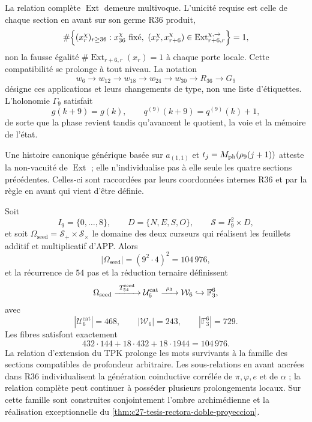 La relation complète \(\operatorname{Ext}\) demeure multivoque.
L'unicité requise est celle de chaque section en avant sur son germe R36
produit,
\[
 \#\Bigl\{(x_r^\chi)_{r\ge36}:x_{36}^\chi\text{ fixé},\ 
 (x_r^\chi,x_{r+6}^\chi)
 \in\operatorname{Ext}^{\chi,\rightarrow}_{r+6,r}\Bigr\}=1,
\]
non la fausse égalité \(\#\operatorname{Ext}_{r+6,r}(x_r)=1\) à chaque porte
locale. Cette compatibilité se prolonge à tout niveau. La notation
\[
 w_6\longrightarrow w_{12}\longrightarrow w_{18}\longrightarrow w_{24}
 \longrightarrow w_{30}\longrightarrow R_{36}\longrightarrow G_9
\]
désigne ces applications et leurs changements de type, non une liste d'étiquettes.
L'holonomie \(\Gamma_9\) satisfait
\[
 g(k+9)=g(k),
 \qquad q^{(9)}(k+9)=q^{(9)}(k)+1,
\]
de sorte que la phase revient tandis qu'avancent le quotient, la voie et la
mémoire de l'état.

Une histoire canonique générique basée sur \(a_{(1,1)}\) et
\(t_j=M_{\rm ph}(\rho_9(j+1))\) atteste la non-vacuité de
\(\operatorname{Ext}\) ; elle n'individualise pas à elle seule les quatre sections
précédentes. Celles-ci sont raccordées par leurs coordonnées internes R36 et par la
règle en avant qui vient d'être définie.

\begin{theorem}
\label{thm:c27-construccion-inaugural-semillas}
Soit
\[
 I_9=\{0,\ldots,8\},\qquad D=\{N,E,S,O\},\qquad
 \mathcal S=I_9^2\times D,
\]
et soit \(\Omega_{\mathrm{seed}}=\mathcal S_+\times\mathcal S_\times\) le
domaine des deux curseurs qui réalisent les feuillets additif et multiplicatif
d'APP. Alors
\[
 |\Omega_{\mathrm{seed}}|=(9^2\cdot4)^2=104\,976,
\]
et la récurrence de \(54\) pas et la réduction ternaire définissent
\[
 \Omega_{\mathrm{seed}}
 \xrightarrow{\ T_{54}^{\rm seed}\ }
 \mathcal U_6^{\mathrm{cat}}
 \xrightarrow{\ \rho_3\ }
 \mathcal W_6
 \hookrightarrow\mathbb F_3^6,
\]
avec
\[
 |\mathcal U_6^{\mathrm{cat}}|=468,
 \qquad |\mathcal W_6|=243,
 \qquad |\mathbb F_3^6|=729.
\]
Les fibres satisfont exactement
\[
 432\cdot144+18\cdot432+18\cdot1944=104\,976.
\]
La relation d'extension du TPK prolonge les mots survivants à la
famille des sections compatibles de profondeur arbitraire. Les sous-relations
en avant ancrées dans R36 individualisent la génération coinductive
corrélée de \(\pi,\varphi,e\) et de \(\alpha\) ; la relation complète peut
continuer à posséder plusieurs prolongements locaux. Sur cette famille sont
construites conjointement l'ombre archimédienne et la réalisation
exceptionnelle du \cref{thm:c27-tesis-rectora-doble-proyeccion}.
\end{theorem}

